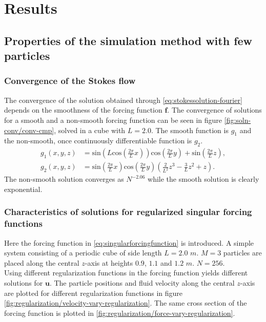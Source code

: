 \documentclass[a4paper,
twoside=false,abstract=false,numbers=noenddot,
titlepage=false,headings=small,parskip=half,version=last]{scrartcl}
\begin{document}
\section{Results}

\subsection{Properties of the simulation method with few particles}

\subsubsection{Convergence of the Stokes flow}
The convergence of the solution obtained through \eqref{eq:stokessolution-fourier} depends on the smoothness of the forcing function $\mathbf{f}$.
The convergence of solutions for a smooth and a non-smooth forcing function can be seen in figure \ref{fig:soln-conv/conv-cmp}, solved in a cube with $L=2.0$.
The smooth function is $g_1$ and the non-smooth, once continuously differentiable function is $g_2$.
\begin{align}
g_1(x,y,z) &= \text{sin}(L\text{cos}(\frac{2\pi}{L}x))\text{cos}(\frac{2\pi}{L}y) + \text{sin}(\frac{2\pi}{L}z),\nonumber\\
g_2(x,y,z) &= \text{sin}(\frac{2\pi}{L}x)\text{cos}(\frac{2\pi}{L}y)(\frac{2}{L^2}z^3 - \frac{3}{L} z^2 + z).\nonumber
\end{align}
The non-smooth solution converges as $N^{-2.06}$ while the smooth solution is clearly exponential.

\subsubsection{Characteristics of solutions for regularized singular forcing functions}
Here the forcing function in \eqref{eq:singularforcingfunction} is introduced.
A simple system consisting of a periodic cube of side length $L=2.0$ $m$. $M=3$ particles are placed along the central $z$-axis at heights $0.9$, $1.1$ and $1.2$ $m$. $N=256$.\\
Using different regularization functions in the forcing function yields different solutions for $\mathbf{u}$.
The particle positions and fluid velocity along the central $z$-axis are plotted for different regularization functions in figure \ref{fig:regularization/velocity-vary-regularization}. The same cross section of the forcing function is plotted in \ref{fig:regularization/force-vary-regularization}.
\end{document}
